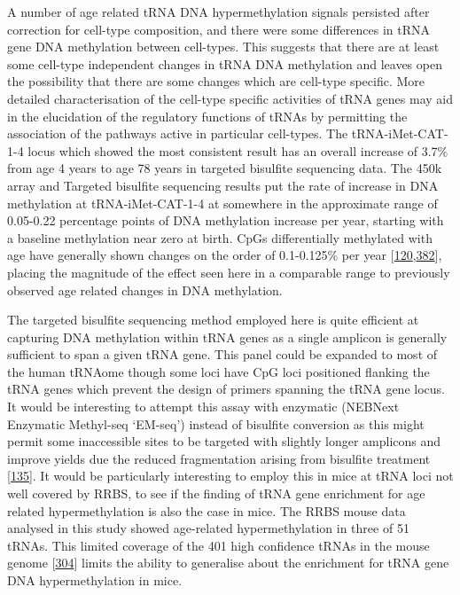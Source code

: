 \documentclass[
]{book}
\begin{document}
A number of age related tRNA DNA hypermethylation signals persisted after correction for cell-type composition, and there were some differences in tRNA gene DNA methylation between cell-types.
This suggests that there are at least some cell-type independent changes in tRNA DNA methylation and leaves open the possibility that there are some changes which are cell-type specific.
More detailed characterisation of the cell-type specific activities of tRNA genes may aid in the elucidation of the regulatory functions of tRNAs by permitting the association of the pathways active in particular cell-types.
The tRNA-iMet-CAT-1-4 locus which showed the most consistent result has an overall increase of 3.7\% from age 4 years to age 78 years in targeted bisulfite sequencing data.
The 450k array and Targeted bisulfite sequencing results put the rate of increase in DNA methylation at tRNA-iMet-CAT-1-4 at somewhere in the approximate range of 0.05-0.22 percentage points of DNA methylation increase per year, starting with a baseline methylation near zero at birth.
CpGs differentially methylated with age have generally shown changes on the order of 0.1-0.125\% per year {[}\protect\hyperlink{ref-Slieker2016}{120},\protect\hyperlink{ref-Xu2014b}{382}{]}, placing the magnitude of the effect seen here in a comparable range to previously observed age related changes in DNA methylation.

The targeted bisulfite sequencing method employed here is quite efficient at capturing DNA methylation within tRNA genes as a single amplicon is generally sufficient to span a given tRNA gene.
This panel could be expanded to most of the human tRNAome though some loci have CpG loci positioned flanking the tRNA genes which prevent the design of primers spanning the tRNA gene locus.
It would be interesting to attempt this assay with enzymatic (NEBNext Enzymatic Methyl-seq `EM-seq') instead of bisulfite conversion as this might permit some inaccessible sites to be targeted with slightly longer amplicons and improve yields due the reduced fragmentation arising from bisulfite treatment {[}\protect\hyperlink{ref-Williams2019}{135}{]}.
It would be particularly interesting to employ this in mice at tRNA loci not well covered by RRBS, to see if the finding of tRNA gene enrichment for age related hypermethylation is also the case in mice.
The RRBS mouse data analysed in this study showed age-related hypermethylation in three of 51 tRNAs.
This limited coverage of the 401 high confidence tRNAs in the mouse genome {[}\protect\hyperlink{ref-Chan2009}{304}{]} limits the ability to generalise about the enrichment for tRNA gene DNA hypermethylation in mice.
\end{document}
